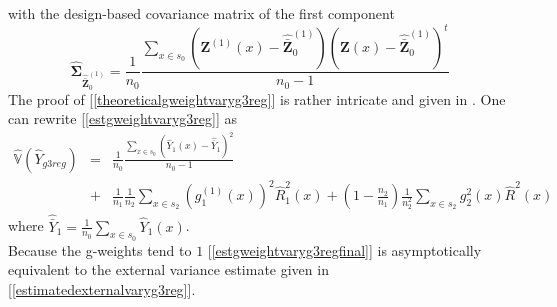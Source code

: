 \documentclass[a4paper,12pt,leqno, titlepage]{article}
\newcommand{\VAR}{\mathbb{V}}
\begin{document}
with the design-based covariance matrix of the first component
\begin{equation}\label{estcovarz}
\hat{\pmb{\Sigma}}_{\hat{\bar{\pmb{Z}}}^{(1)}_{0}}=
\frac{1}{n_{0}}\frac{\sum_{x\in{s_{0}}}(\pmb{Z}^{(1)}(x)-
\hat{\bar{\pmb{Z}}}^{(1)}_{0})(\pmb{Z}(x)-\hat{\bar{\pmb{Z}}}^{(1)}_{0})^t}{n_0-1}
\end{equation}
The proof of [\ref{theoreticalgweightvaryg3reg}] is rather intricate and given in \cite{mandallazreport3}.
One can rewrite [\ref{estgweightvaryg3reg}] as
\begin{eqnarray}\label{estgweightvaryg3regfinal}
\hat{\VAR}(\hat{Y}_{g3reg})&=&\frac{1}{n_0}\frac{\sum_{x\in{s_0}}(\hat{Y}_1(x)-\hat{\bar{Y}}_1)^2}{n_0-1}
\nonumber\\
&+&\frac{1}{n_1}\frac{1}{n_2}\sum_{x\in{s}_2}(g_1^{(1)}(x))^2\hat{R}^2_1(x)+
(1-\frac{n_2}{n_1})\frac{1}{n^2_2}\sum_{x\in{s}_2}g_2^2(x)\hat{R}^2(x)
\end{eqnarray}
\noindent where $\hat{\bar{Y}}_1=\frac{1}{n_0}\sum_{x\in{s_0}}\hat{Y}_1(x)$. \\
Because the g-weights tend to $1$ [\ref{estgweightvaryg3regfinal}] is asymptotically equivalent to the external variance estimate given in [\ref{estimatedexternalvaryg3reg}].
\end{document}
